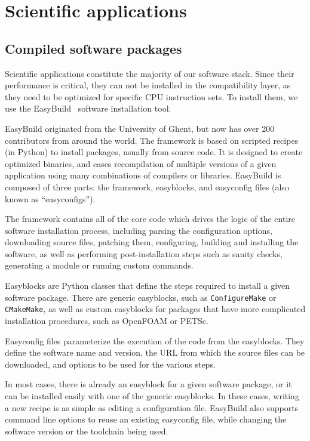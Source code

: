 \documentclass[sigconf]{acmart}
\begin{document}
\section{Scientific applications}
\label{sec:Scientific_applications}

\subsection{Compiled software packages}
\label{sub:Compiled_software_packages}
Scientific applications constitute the majority of our software stack. Since their performance is critical, they can not be installed in the compatibility layer, as they need to be optimized for specific CPU instruction sets. To install them, we use the EasyBuild~\cite{EasyBuild2012,EasyBuild2014,EasyBuild2016} software installation tool.

EasyBuild originated from the University of Ghent, but now has over 200 contributors from around the world. The framework is based on scripted recipes (in Python) to install packages, usually from source code. It is designed to create optimized binaries, and eases recompilation of multiple versions of a given application using many combinations of compilers or libraries. EasyBuild is composed of three parts: the framework, easyblocks, and easyconfig files (also known as ``easyconfigs''). 

The framework contains all of the core code which drives the logic of the entire software installation process, including parsing the configuration options, downloading source files, patching them, configuring, building and installing the software, as well as performing post-installation steps such as sanity checks, generating a module or running custom commands. 

Easyblocks are Python classes that define the steps required to install a given software package. There are generic easyblocks, such as \texttt{ConfigureMake} or \texttt{CMakeMake}, as well as custom easyblocks for packages that have more complicated installation procedures, such as OpenFOAM or PETSc. 

Easyconfig files parameterize the execution of the code from the easyblocks. They define the software name and version, the URL from which the source files can be downloaded, and options to be used for the various steps. 

In most cases, there is already an easyblock for a given software package, or it can be installed easily with one of the generic easyblocks. In these cases, writing a new recipe is as simple as editing a configuration file. EasyBuild also supports command line options to reuse an existing easyconfig file, while changing the software version or the toolchain being used. 
\end{document}
